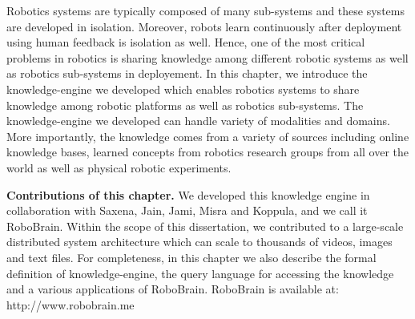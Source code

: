 
Robotics systems are typically composed of many sub-systems and these systems are developed in isolation. Moreover, robots learn continuously after deployment using human feedback is isolation as well. Hence, one of the most critical problems in robotics is sharing knowledge among different robotic systems as well as robotics sub-systems in deployement. In this chapter, we introduce the knowledge-engine we developed which enables robotics systems to share knowledge among robotic platforms as well as robotics sub-systems. The knowledge-engine we developed can handle variety of modalities and domains. More importantly, the knowledge comes from a variety of sources including online knowledge bases, learned concepts from robotics research groups from all over the world as well as physical robotic experiments.

\noindent\textbf{Contributions of this chapter.} We developed this knowledge engine in collaboration with Saxena, Jain, Jami, Misra and Koppula, and we call it RoboBrain. Within the scope of this dissertation, we contributed to a large-scale distributed system architecture which can scale to thousands of videos, images and text files. For completeness, in this chapter we also describe the formal definition of knowledge-engine, the query language for accessing the knowledge and a various applications of RoboBrain. RoboBrain is available at: http://www.robobrain.me





















